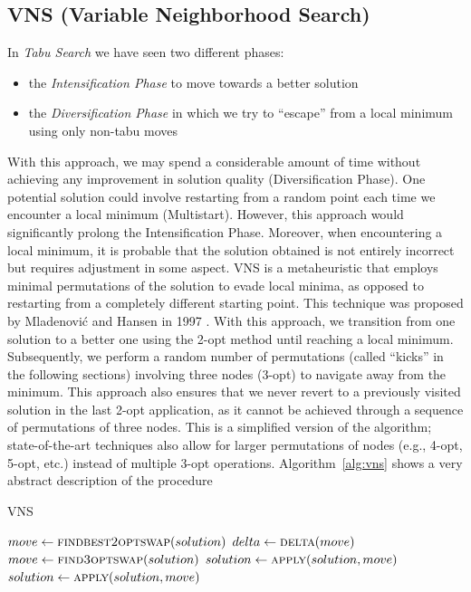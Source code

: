 \documentclass{article}
\begin{document}
\subsection{VNS (Variable Neighborhood Search)}
In \textit{Tabu Search} we have seen two different phases:
\begin{itemize}
        \item the \textit{Intensification Phase} to move towards a better solution
        \item the \textit{Diversification Phase} in which we try to ``escape'' from a local minimum using only
        non-tabu moves
\end{itemize}
With this approach, we may spend a considerable amount of time without achieving any improvement in
solution quality (Diversification Phase). One potential solution could involve restarting from a random
point each time we encounter a local minimum (Multistart). However, this approach would significantly
prolong the Intensification Phase. Moreover, when encountering a local minimum, it is probable
that the solution obtained is not entirely incorrect but requires adjustment in some aspect.
VNS is a metaheuristic that employs minimal permutations of the solution to evade local minima, as
opposed to restarting from a completely different starting point.
This technique was proposed by Mladenovi{\'c} and Hansen in 1997 \cite{mladenovic1997variable}.
With this approach, we transition from one solution to a better one using the 2-opt method until reaching
a local minimum. Subsequently, we perform a random number of permutations (called ``kicks'' in the following sections)
involving three nodes (3-opt) to navigate away from the minimum.
This approach also ensures that we never revert to a previously visited
solution in the last 2-opt application, as it cannot be achieved through a sequence of permutations of
three nodes.
This is a simplified version of the algorithm; state-of-the-art techniques also allow for larger permutations
of nodes (e.g., 4-opt, 5-opt, etc.) instead of multiple 3-opt operations.
Algorithm~\ref{alg:vns} shows a very abstract description of the procedure

\begin{algorithm}[ht]
\caption{VNS}
\label{alg:vns}
\begin{algorithmic}
        \State{}
                \State $move \gets \Call{findbest2optswap}{solution}$
                \State $delta \gets \Call{delta}{move}$
                                \State $move \gets \Call{find3optswap}{solution}$
                                \State $solution \gets \Call{apply}{solution, move}$
                        \EndFor
                \Else
                        \State $solution \gets \Call{apply}{solution, move}$
                \EndIf
        \EndWhile
\EndProcedure
\end{algorithmic}
\end{algorithm}
\end{document}
